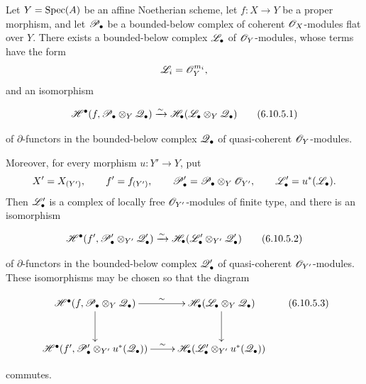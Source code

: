 \begin{theorem}[6.10.5]
\label{III.6.10.5}
Let $Y=\operatorname{Spec}(A)$ be an affine Noetherian scheme, let
$f:X\to Y$ be a proper morphism, and let $\mathscr{P}_\bullet$ be a
bounded-below complex of coherent $\mathscr{O}_X$-modules \textup{flat} over
$Y$.  There exists a bounded-below complex $\mathscr{L}_\bullet$ of
$\mathscr{O}_Y$-modules, whose terms have the form
\[
  \mathscr{L}_i=\mathscr{O}_Y^{m_i},
\]
and an isomorphism
\begin{env}[6.10.5.1]
\label{III.6.10.5.1}
\[
  \mathscr{H}^\bullet
  (f,\mathscr{P}_\bullet\otimes_Y\mathscr{Q}_\bullet)
  \xrightarrow{\sim}
  \mathscr{H}_\bullet
  (\mathscr{L}_\bullet\otimes_Y\mathscr{Q}_\bullet)
  \tag{6.10.5.1}\label{III.6.10.5.1.eq}
\]
\end{env}
of $\partial$-functors in the bounded-below complex
$\mathscr{Q}_\bullet$ of quasi-coherent $\mathscr{O}_Y$-modules.

Moreover, for every morphism $u:Y'\to Y$, put
\[
  X'=X_{(Y')},
  \qquad
  f'=f_{(Y')},
  \qquad
  \mathscr{P}_\bullet'
  =
  \mathscr{P}_\bullet\otimes_Y\mathscr{O}_{Y'},
  \qquad
  \mathscr{L}_\bullet'=u^*(\mathscr{L}_\bullet).
\]
Then $\mathscr{L}_\bullet'$ is a complex of locally free
$\mathscr{O}_{Y'}$-modules of finite type, and there is an isomorphism
\begin{env}[6.10.5.2]
\label{III.6.10.5.2}
\[
  \mathscr{H}^\bullet
  (f',\mathscr{P}_\bullet'\otimes_{Y'}\mathscr{Q}_\bullet')
  \xrightarrow{\sim}
  \mathscr{H}_\bullet
  (\mathscr{L}_\bullet'\otimes_{Y'}\mathscr{Q}_\bullet')
  \tag{6.10.5.2}\label{III.6.10.5.2.eq}
\]
\end{env}
of $\partial$-functors in the bounded-below complex
$\mathscr{Q}_\bullet'$ of quasi-coherent $\mathscr{O}_{Y'}$-modules.  These
isomorphisms may be chosen so that the diagram
\begin{env}[6.10.5.3]
\label{III.6.10.5.3}
\[
\xymatrix@C=24pt@R=30pt{
  \sh H^\bullet
  (f,\sh P_\bullet\otimes_Y\sh Q_\bullet)
  \ar[r]^-{\sim}\ar[d]
  &
  \sh H_\bullet
  (\sh L_\bullet\otimes_Y\sh Q_\bullet)
  \ar[d]
  \\
  \sh H^\bullet
  (f',\sh P_\bullet'\otimes_{Y'}u^*(\sh Q_\bullet))
  \ar[r]^-{\sim}
  &
  \sh H_\bullet
  (\sh L_\bullet'\otimes_{Y'}u^*(\sh Q_\bullet))
}
\tag{6.10.5.3}\label{III.6.10.5.3.eq}
\]
\end{env}
commutes.
\end{theorem}

